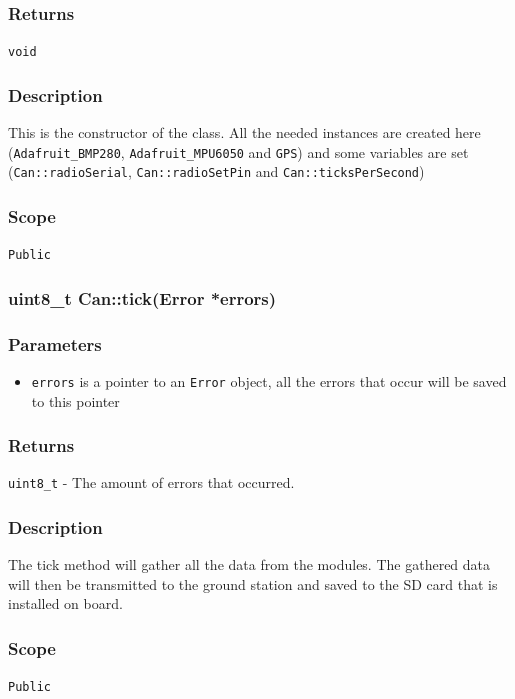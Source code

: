 \documentclass[a4paper,10pt]{article}
\begin{document}
				\subsubsection*{Returns}
					\texttt{void}
					
				\subsubsection*{Description}
					This is the constructor of the class. All the needed instances are created here (\texttt{Adafruit\_BMP280}, \texttt{Adafruit\_MPU6050} and \texttt{GPS}) and some variables are set (\texttt{Can::radioSerial}, \texttt{Can::radioSetPin} and \texttt{Can::ticksPerSecond})
				
				\subsubsection*{Scope}
					\texttt{Public}
				
				
				
				\vspace{2ex}
			
			
			
			\subsubsection[tick]{uint8\_t Can::tick(Error *errors)}
				\subsubsection*{Parameters}
					\begin{itemize}
						\item \texttt{errors} is a pointer to an \texttt{Error} object, all the errors that occur will be saved to this pointer
					\end{itemize}
				
				\subsubsection*{Returns}
					\texttt{uint8\_t} - 
					The amount of errors that occurred.
			
				\subsubsection*{Description}
					The tick method will gather all the data from the modules. The gathered data will then be transmitted to the ground station and saved to the SD card that is installed on board. 
				
				\subsubsection*{Scope}
					\texttt{Public}
\end{document}
